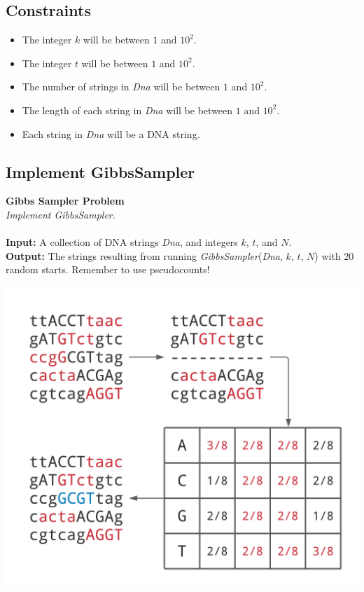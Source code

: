 \documentclass{article}
\begin{document}
\subsection*{Constraints}
\begin{itemize}
    \item The integer $k$ will be between $1$ and $10^2$.
    \item The integer $t$ will be between $1$ and $10^2$.
    \item The number of strings in \emph{Dna} will be between $1$ and $10^2$.
    \item The length of each string in \emph{Dna} will be between $1$ and $10^2$.
    \item Each string in \emph{Dna} will be a DNA string.
\end{itemize}
\pagebreak
\subsection{Implement GibbsSampler}
\hline\vspace{5}
\noindent\textbf{Gibbs Sampler Problem}\\
\emph{Implement GibbsSampler}.\\ \\
\noindent\textbf{Input:} A collection of DNA strings \emph{Dna}, and integers $k$, $t$, and $N$.\\
\noindent\textbf{Output:} The strings resulting from running \emph{GibbsSampler}(\emph{Dna}, $k$, $t$, $N$) with 20 random starts. Remember to use pseudocounts!
\begin{center}
    \includegraphics[scale=0.2]{c2/logos/2G.png} 
\end{center}
\hline\vspace{5}
\end{document}
